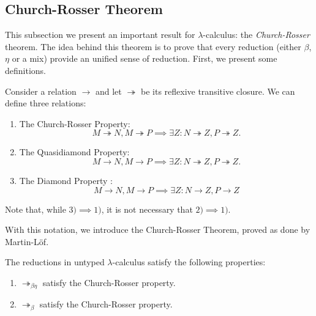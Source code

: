 \subsection{Church-Rosser Theorem}

This subsection we present an important result for $\lambda$-calculus: the \emph{Church-Rosser} theorem. The idea behind this theorem is to prove that every reduction (either $\beta$, $\eta$ or a mix) provide an unified sense of reduction. First, we present some definitions.

\begin{definition}
  Consider a relation $\to$ and let $\twoheadrightarrow$ be its reflexive transitive closure. We can define three relations:

  \begin{enumerate}
  \item The Church-Rosser Property: $$M\twoheadrightarrow N, M\twoheadrightarrow P \implies \exists Z : N\twoheadrightarrow Z, P\twoheadrightarrow Z.$$
  \item The Quasidiamond Property: $$M\to N, M\to P \implies \exists Z : N\twoheadrightarrow Z, P\twoheadrightarrow Z.$$
  \item The Diamond Property : $$M\to N, M\to P \implies \exists Z : N\to Z,P\to Z$$
  \end{enumerate}
\end{definition}

\begin{remark} 
  Note that, while $3)\implies 1)$, it is not necessary that $2)\implies 1)$.
\end{remark}


With this notation, we introduce the Church-Rosser Theorem, proved as done by Martin-Löf.

\begin{theorem}The reductions in untyped $\lambda$-calculus satisfy the following properties:\label{theo:church-rosser}
  \begin{enumerate}
  \item $\twoheadrightarrow_{\beta\eta}$ satisfy the Church-Rosser property.
  \item $\twoheadrightarrow_{\beta}$ satisfy the Church-Rosser property.
  \end{enumerate}
\end{theorem}




